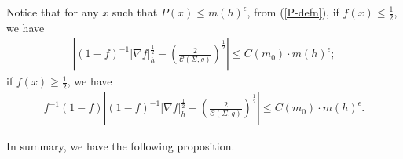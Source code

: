 \documentclass[letter]{amsart}
\theoremstyle{definition}
\theoremstyle{remark}
\begin{document}
Notice that for any $x$ such that $P(x) \leq m(h)^{\epsilon }$, from (\ref{P-defn}), if $f(x) \leq \frac{1}{2}$, we have 
\begin{align*}
	\left| (1-f)^{-1} |\nabla f|_h^{\frac{1}{2}} - \left( \frac{2}{\mathcal{C}(\Sigma ,g)} \right) ^{\frac{1}{2}} \right| \leq C(m_0)\cdot m(h)^{\epsilon };
\end{align*}
if $f(x) \geq \frac{1}{2}$, we have
\begin{align*}
	f^{-1}(1-f) \left| (1-f)^{-1} |\nabla f|_h^{\frac{1}{2}} - \left( \frac{2}{\mathcal{C}(\Sigma ,g)} \right) ^{\frac{1}{2}} \right| \leq C(m_0)\cdot m(h)^{\epsilon }.
\end{align*}

In summary, we have the following proposition.
\end{document}
